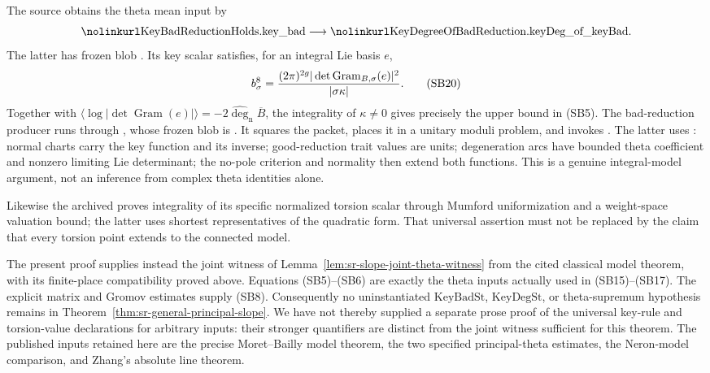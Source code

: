 The source obtains the theta mean input by
\[
 \srcid{KeyBadReductionHolds.key\_bad}
 \longrightarrow
 \srcid{KeyDegreeOfBadReduction.keyDeg\_of\_keyBad}.
\]
The latter has frozen blob
.
Its key scalar satisfies, for an integral
Lie basis \(e\),
\[
 b_\sigma^8=
 { (2\pi)^{2g}
             |\det\operatorname{Gram}_{B,\sigma}(e)|^2
        \over|\sigma\kappa|}.                         \tag{SB20}
\]
Together with
\(\langle\log|\det\operatorname{Gram}(e)|\rangle
=-2\widehat{\deg}_{\mathrm n}\overline B\),
the integrality of \(\kappa\ne0\) gives
precisely the upper bound in (SB5).
The bad-reduction producer runs through
,
whose frozen blob is
.
It squares the packet, places it in a
unitary moduli problem, and invokes
.
The latter uses
:
normal charts carry the key function and
its inverse; good-reduction trait values
are units; degeneration arcs have bounded
theta coefficient and nonzero limiting
Lie determinant; the no-pole criterion and
normality then extend both functions.
This is a genuine integral-model argument,
not an inference from complex theta
identities alone.

Likewise the archived
 proves
integrality of its specific normalized
torsion scalar through Mumford
uniformization and a weight-space valuation
bound; the latter uses shortest
representatives of the quadratic form.
That universal assertion must not be
replaced by the claim that every torsion
point extends to the connected model.

The present proof supplies instead the
joint witness of
Lemma~\ref{lem:sr-slope-joint-theta-witness}
from the cited classical model theorem,
with its finite-place compatibility
proved above.
Equations (SB5)--(SB6) are exactly the
theta inputs actually used in
(SB15)--(SB17).
The explicit matrix and Gromov estimates
supply (SB8).
Consequently no uninstantiated
\(\mathrm{KeyBadSt}\),
\(\mathrm{KeyDegSt}\), or
theta-supremum hypothesis remains in
Theorem~\ref{thm:sr-general-principal-slope}.
We have not thereby supplied a separate
prose proof of the universal key-rule and
torsion-value declarations for arbitrary
inputs: their stronger quantifiers are
distinct from the joint witness sufficient
for this theorem.
The published inputs retained here are
the precise Moret--Bailly model theorem,
the two specified principal-theta
estimates, the Neron-model comparison, and
Zhang's absolute line theorem.
